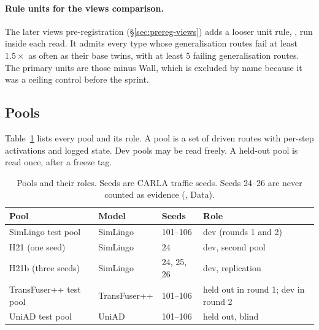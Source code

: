 \paragraph{Rule units for the views comparison.}
The later views pre-registration (\S\ref{sec:prereg-views}) adds a looser unit
rule, , run inside each read.
It admits every type whose generalisation routes fail at least $1.5\times$ as
often as their base twins, with at least 5 failing generalisation routes. The
primary units are those minus Wall, which is excluded by name because it was a
ceiling control before the sprint.

\subsection{Pools}

Table~\ref{tab:pools} lists every pool and its role. A pool is a set of driven
routes with per-step activations and logged state. Dev pools may be read freely.
A held-out pool is read once, after a freeze tag.

\begin{table}[t]
\centering
\small
\begin{tabular}{@{}llll@{}}
\toprule
Pool & Model & Seeds & Role \\
\midrule
SimLingo test pool & SimLingo & 101--106 & dev (rounds 1 and 2) \\
H21 (one seed) & SimLingo & 24 & dev, second pool \\
H21b (three seeds) & SimLingo & 24, 25, 26 & dev, replication \\
TransFuser++ test pool & TransFuser++ & 101--106 & held out in round 1; dev in round 2 \\
UniAD test pool & UniAD & 101--106 & held out, blind \\
\bottomrule
\end{tabular}
\caption{Pools and their roles. Seeds are CARLA traffic seeds. Seeds 24--26 are
never counted as evidence (, Data).}
\label{tab:pools}
\end{table}

